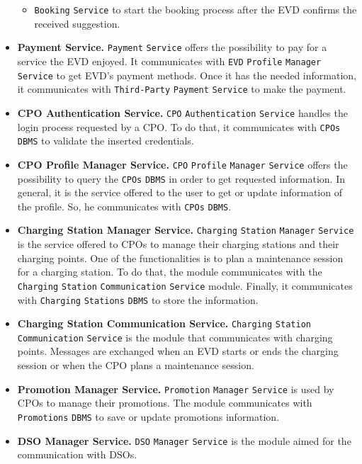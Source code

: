 \begin{itemize}
\begin{itemize}
        \item \verb|Booking| \verb|Service| to start the booking process after the EVD confirms the received suggestion.
    \end{itemize}
    \item \textbf{Payment Service.} \verb|Payment| \verb|Service| offers the possibility to pay for a service the EVD enjoyed.
    It communicates with \verb|EVD| \verb|Profile| \verb|Manager| \verb|Service| to get EVD's payment methods.
    Once it has the needed information, it communicates with \verb|Third-Party| \verb|Payment| \verb|Service| to make the payment.
    \item \textbf{CPO Authentication Service.} \verb|CPO| \verb|Authentication| \verb|Service| handles the login process requested by a CPO\@.
    To do that, it communicates with \verb|CPOs| \verb|DBMS| to validate the inserted credentials.
    \item \textbf{CPO Profile Manager Service.} \verb|CPO| \verb|Profile| \verb|Manager| \verb|Service| offers the possibility to query
    the \verb|CPOs| \verb|DBMS| in order to get requested information.
    In general, it is the service offered to the user to get or update information of the profile.
    So, he communicates with \verb|CPOs| \verb|DBMS|.
    \item \textbf{Charging Station Manager Service.} \verb|Charging| \verb|Station| \verb|Manager| \verb|Service| is the service offered to CPOs
    to manage their charging stations and their charging points.
    One of the functionalities is to plan a maintenance session for a charging station.
    To do that, the module communicates with the \verb|Charging| \verb|Station| \verb|Communication| \verb|Service| module.
    Finally, it communicates with \verb|Charging| \verb|Stations| \verb|DBMS| to store the information.
    \item \textbf{Charging Station Communication Service.} \verb|Charging| \verb|Station| \verb|Communication| \verb|Service| is the module
    that communicates with charging points.
    Messages are exchanged when an EVD starts or ends the charging session or when the CPO plans a maintenance session.
    \item \textbf{Promotion Manager Service.} \verb|Promotion| \verb|Manager| \verb|Service| is used by CPOs to manage their promotions.
    The module communicates with \verb|Promotions| \verb|DBMS| to save or update promotions information.
    \item \textbf{DSO Manager Service.} \verb|DSO| \verb|Manager| \verb|Service| is the module aimed for the communication with DSOs.

\end{itemize}
